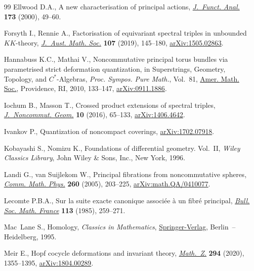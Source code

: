 \begin{thebibliography}{99}
Ellwood D.A., A new characterisation of principal actions, \href{https://doi.org/10.1006/jfan.2000.3561}{\textit{J.~Funct.
 Anal.}} \textbf{173} (2000), 49--60.

Forsyth I., Rennie A., Factorisation of equivariant spectral triples in
 unbounded {$KK$}-theory, \href{https://doi.org/10.1017/s1446788718000423}{\textit{J.~Aust. Math. Soc.}} \textbf{107} (2019),
 145--180, \href{https://arxiv.org/abs/1505.02863}{arXiv:1505.02863}.

Hannabuss K.C., Mathai V., Noncommutative principal torus bundles via
 parametrised strict deformation quantization, in Superstrings, Geometry,
 Topology, and {$C^\ast$}-Algebras, \textit{Proc. Sympos. Pure Math.},
 Vol.~81, \href{https://doi.org/10.1090/pspum/081/2681761}{Amer. Math. Soc.}, Providence, RI, 2010, 133--147,
 \href{https://arxiv.org/abs/0911.1886}{arXiv:0911.1886}.

Iochum B., Masson T., Crossed product extensions of spectral triples,
 \href{https://doi.org/10.4171/JNCG/229}{\textit{J.~Noncommut. Geom.}} \textbf{10} (2016), 65--133, \href{https://arxiv.org/abs/1406.4642}{arXiv:1406.4642}.

Ivankov P., Quantization of noncompact coverings, \href{https://arxiv.org/abs/1702.07918}{arXiv:1702.07918}.

Kobayashi S., Nomizu K., Foundations of differential geometry. {V}ol.~{II},
 \textit{Wiley Classics Library}, John Wiley \& Sons, Inc., New York, 1996.

Landi G., van Suijlekom W., Principal fibrations from noncommutative spheres,
 \href{https://doi.org/10.1007/s00220-005-1377-7}{\textit{Comm. Math. Phys.}} \textbf{260} (2005), 203--225,
 \href{https://arxiv.org/abs/math.QA/0410077}{arXiv:math.QA/0410077}.

Lecomte P.B.A., Sur la suite exacte canonique associ\'ee \`a un fibr\'e
 principal, \href{https://doi.org/10.24033/bsmf.2032}{\textit{Bull. Soc. Math. France}} \textbf{113} (1985), 259--271.

Mac~Lane S., Homology, \textit{Classics in Mathematics}, \href{https://doi.org/10.1007/978-3-642-62029-4}{Springer-Verlag}, Berlin~--
 Heidelberg, 1995.

Meir E., Hopf cocycle deformations and invariant theory, \href{https://doi.org/10.1007/s00209-019-02326-5}{\textit{Math.~Z.}}
 \textbf{294} (2020), 1355--1395, \href{https://arxiv.org/abs/1804.00289}{arXiv:1804.00289}.


\end{thebibliography}

